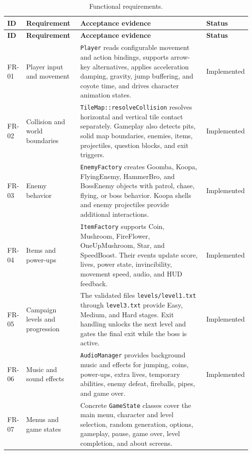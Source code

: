 \documentclass{template}
\begin{document}
\begin{longtable}{@{}p{1.1cm}p{3.2cm}p{7.3cm}p{2.4cm}@{}}
    \caption{Functional requirements.}\label{tab:functional-requirements}\\
    \toprule
    \textbf{ID} & \textbf{Requirement} & \textbf{Acceptance evidence} &
    \textbf{Status} \\
    \midrule
    \endfirsthead
    \toprule
    \textbf{ID} & \textbf{Requirement} & \textbf{Acceptance evidence} &
    \textbf{Status} \\
    \midrule
    \endhead
    FR-01 & Player input and movement & \texttt{Player} reads configurable
    movement and action bindings, supports arrow-key alternatives, applies
    acceleration damping, gravity, jump buffering, and coyote time, and drives
    character animation states. & Implemented \\
    FR-02 & Collision and world boundaries & \texttt{TileMap::resolveCollision}
    resolves horizontal and vertical tile contact separately. Gameplay also
    detects pits, solid map boundaries, enemies, items, projectiles, question
    blocks, and exit triggers. & Implemented \\
    FR-03 & Enemy behavior & \texttt{EnemyFactory} creates Goomba, Koopa,
    FlyingEnemy, HammerBro, and BossEnemy objects with patrol, chase, flying, or
    boss behavior. Koopa shells and enemy projectiles provide additional
    interactions. & Implemented \\
    FR-04 & Items and power-ups & \texttt{ItemFactory} supports Coin,
    Mushroom, FireFlower, OneUpMushroom, Star, and SpeedBoost. Their events
    update score, lives, power state, invincibility, movement speed, audio, and
    HUD feedback. & Implemented \\
    FR-05 & Campaign levels and progression & The validated files
    \texttt{levels/level1.txt} through \texttt{level3.txt} provide Easy,
    Medium, and Hard stages. Exit handling unlocks the next level and gates the
    final exit while the boss is active. & Implemented \\
    FR-06 & Music and sound effects & \texttt{AudioManager} provides
    background music and effects for jumping, coins, power-ups, extra lives,
    temporary abilities, enemy defeat, fireballs, pipes, and game over. &
    Implemented \\
    FR-07 & Menus and game states & Concrete \texttt{GameState} classes cover
    the main menu, character and level selection, random generation, options,
    gameplay, pause, game over, level completion, and about screens. &

\end{longtable}
\end{document}
